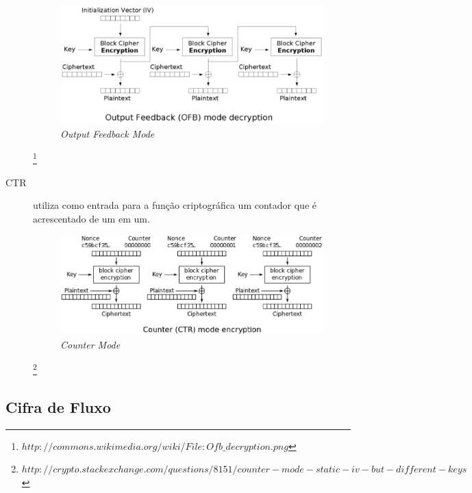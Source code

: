\begin{description}
\begin{figure}[h]
\centering
\includegraphics[keepaspectratio=true,scale=0.7]
    {figuras/ofb.eps}
    \caption{\textit{Output Feedback Mode } } 
\end{figure}\footnote{$http://commons.wikimedia.org/wiki/File:Ofb\_decryption.png$}
\item[CTR] utiliza como entrada para a função criptográfica um contador que é acrescentado de um em um. 
\begin{figure}[h]
\centering
\includegraphics[keepaspectratio=true,scale=0.5]
    {figuras/ctr.eps}
    \caption{\textit{Counter Mode} } 
\end{figure}\footnote{$http://crypto.stackexchange.com/questions/8151/counter-mode-static-iv-but-different-keys$}
\end{description}

\subsection{Cifra de Fluxo}
\label{stream-cipher}

